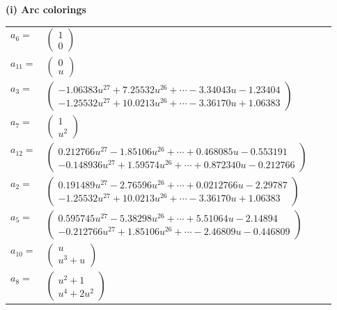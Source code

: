 \documentclass[1p]{elsarticle_modified}
\theoremstyle{definition}
\begin{document}
\flushleft \textbf{(i) Arc colorings}\\
\begin{tabular}{m{7pt} m{180pt} m{7pt} m{180pt} }
\flushright $a_{6}=$&$\begin{pmatrix}1\\0\end{pmatrix}$ \\
\flushright $a_{11}=$&$\begin{pmatrix}0\\u\end{pmatrix}$ \\
\flushright $a_{3}=$&$\begin{pmatrix}-1.06383 u^{27}+7.25532 u^{26}+\cdots-3.34043 u-1.23404\\-1.25532 u^{27}+10.0213 u^{26}+\cdots-3.36170 u+1.06383\end{pmatrix}$ \\
\flushright $a_{7}=$&$\begin{pmatrix}1\\u^2\end{pmatrix}$ \\
\flushright $a_{12}=$&$\begin{pmatrix}0.212766 u^{27}-1.85106 u^{26}+\cdots+0.468085 u-0.553191\\-0.148936 u^{27}+1.59574 u^{26}+\cdots+0.872340 u-0.212766\end{pmatrix}$ \\
\flushright $a_{2}=$&$\begin{pmatrix}0.191489 u^{27}-2.76596 u^{26}+\cdots+0.0212766 u-2.29787\\-1.25532 u^{27}+10.0213 u^{26}+\cdots-3.36170 u+1.06383\end{pmatrix}$ \\
\flushright $a_{5}=$&$\begin{pmatrix}0.595745 u^{27}-5.38298 u^{26}+\cdots+5.51064 u-2.14894\\-0.212766 u^{27}+1.85106 u^{26}+\cdots-2.46809 u-0.446809\end{pmatrix}$ \\
\flushright $a_{10}=$&$\begin{pmatrix}u\\u^3+u\end{pmatrix}$ \\
\flushright $a_{8}=$&$\begin{pmatrix}u^2+1\\u^4+2 u^2\end{pmatrix}$ \\

\end{tabular}
\end{document}
